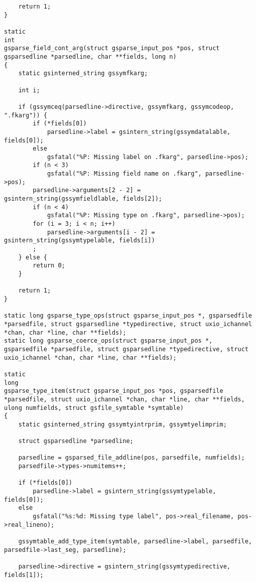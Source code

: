 \documentclass{report}
\begin{document}
\begin{verbatim}
    return 1;
}

static
int
gsparse_field_cont_arg(struct gsparse_input_pos *pos, struct gsparsedline *parsedline, char **fields, long n)
{
    static gsinterned_string gssymfkarg;

    int i;

    if (gssymceq(parsedline->directive, gssymfkarg, gssymcodeop, ".fkarg")) {
        if (*fields[0])
            parsedline->label = gsintern_string(gssymdatalable, fields[0]);
        else
            gsfatal("%P: Missing label on .fkarg", parsedline->pos);
        if (n < 3)
            gsfatal("%P: Missing field name on .fkarg", parsedline->pos);
        parsedline->arguments[2 - 2] = gsintern_string(gssymfieldlable, fields[2]);
        if (n < 4)
            gsfatal("%P: Missing type on .fkarg", parsedline->pos);
        for (i = 3; i < n; i++)
            parsedline->arguments[i - 2] = gsintern_string(gssymtypelable, fields[i])
        ;
    } else {
        return 0;
    }

    return 1;
}

static long gsparse_type_ops(struct gsparse_input_pos *, gsparsedfile *parsedfile, struct gsparsedline *typedirective, struct uxio_ichannel *chan, char *line, char **fields);
static long gsparse_coerce_ops(struct gsparse_input_pos *, gsparsedfile *parsedfile, struct gsparsedline *typedirective, struct uxio_ichannel *chan, char *line, char **fields);

static
long
gsparse_type_item(struct gsparse_input_pos *pos, gsparsedfile *parsedfile, struct uxio_ichannel *chan, char *line, char **fields, ulong numfields, struct gsfile_symtable *symtable)
{
    static gsinterned_string gssymtyintrprim, gssymtyelimprim;

    struct gsparsedline *parsedline;

    parsedline = gsparsed_file_addline(pos, parsedfile, numfields);
    parsedfile->types->numitems++;

    if (*fields[0])
        parsedline->label = gsintern_string(gssymtypelable, fields[0]);
    else
        gsfatal("%s:%d: Missing type label", pos->real_filename, pos->real_lineno);

    gssymtable_add_type_item(symtable, parsedline->label, parsedfile, parsedfile->last_seg, parsedline);

    parsedline->directive = gsintern_string(gssymtypedirective, fields[1]);


\end{verbatim}
\end{document}
